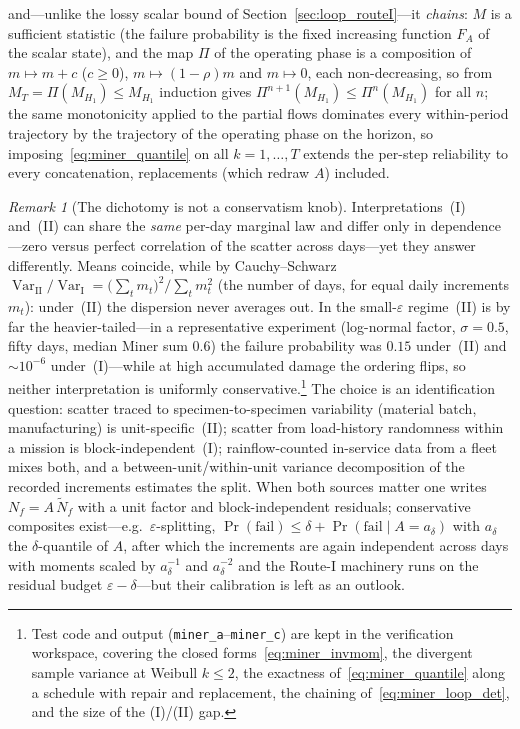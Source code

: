 \documentclass[11pt,a4paper]{article}
\theoremstyle{plain}
\theoremstyle{definition}
\theoremstyle{remark}
\newtheorem{remark}[theorem]{Remark}
\begin{document}
and---unlike the lossy scalar bound of Section~\ref{sec:loop_routeI}---it \emph{chains}: $M$ is a sufficient statistic (the failure probability is the fixed increasing function $F_A$ of the scalar state), and the map $\Pi$ of the operating phase is a composition of $m \mapsto m + c$ ($c \ge 0$), $m \mapsto (1-\rho)m$ and $m \mapsto 0$, each non-decreasing, so from $M_T = \Pi(M_{H_1}) \le M_{H_1}$ induction gives $\Pi^{n+1}(M_{H_1}) \le \Pi^{n}(M_{H_1})$ for all $n$; the same monotonicity applied to the partial flows dominates every within-period trajectory by the trajectory of the operating phase on the horizon, so imposing~\eqref{eq:miner_quantile} on all $k = 1,\dots,T$ extends the per-step reliability to every concatenation, replacements (which redraw $A$) included.

\begin{remark}[The dichotomy is not a conservatism knob]\label{rem:miner_dichotomy}
Interpretations~(I) and~(II) can share the \emph{same} per-day marginal law and differ only in dependence---zero versus perfect correlation of the scatter across days---yet they answer differently.
Means coincide, while by Cauchy--Schwarz $\operatorname{Var}_{\mathrm{II}}/\operatorname{Var}_{\mathrm{I}} = \big(\sum_t m_t\big)^2 / \sum_t m_t^2$ (the number of days, for equal daily increments $m_t$): under~(II) the dispersion never averages out.
In the small-$\varepsilon$ regime~(II) is by far the heavier-tailed---in a representative experiment (log-normal factor, $\sigma = 0.5$, fifty days, median Miner sum $0.6$) the failure probability was $0.15$ under~(II) and $\sim 10^{-6}$ under~(I)---while at high accumulated damage the ordering flips, so neither interpretation is uniformly conservative.\footnote{Test code and output (\texttt{miner\_a}--\texttt{miner\_c}) are kept in the verification workspace, covering the closed forms~\eqref{eq:miner_invmom}, the divergent sample variance at Weibull $k \le 2$, the exactness of~\eqref{eq:miner_quantile} along a schedule with repair and replacement, the chaining of~\eqref{eq:miner_loop_det}, and the size of the (I)/(II) gap.}
The choice is an identification question: scatter traced to specimen-to-specimen variability (material batch, manufacturing) is unit-specific~(II); scatter from load-history randomness within a mission is block-independent~(I); rainflow-counted in-service data from a fleet mixes both, and a between-unit/within-unit variance decomposition of the recorded increments estimates the split.
When both sources matter one writes $N_f = A\,\widetilde N_f$ with a unit factor and block-independent residuals; conservative composites exist---e.g.\ $\varepsilon$-splitting, $\Pr(\text{fail}) \le \delta + \Pr(\text{fail} \mid A = a_\delta)$ with $a_\delta$ the $\delta$-quantile of $A$, after which the increments are again independent across days with moments scaled by $a_\delta^{-1}$ and $a_\delta^{-2}$ and the Route-I machinery runs on the residual budget $\varepsilon - \delta$---but their calibration is left as an outlook.
\end{remark}
\end{document}
